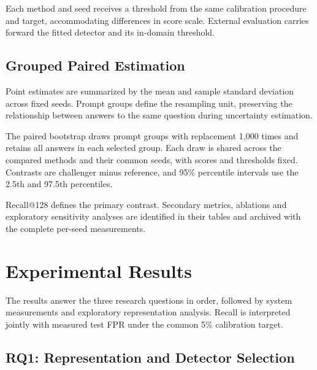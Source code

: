 Each method and seed receives a threshold from the same calibration procedure and target, accommodating differences in score scale. External evaluation carries forward the fitted detector and its in-domain threshold.

\subsection{Grouped Paired Estimation}
Point estimates are summarized by the mean and sample standard deviation across fixed seeds. Prompt groups define the resampling unit, preserving the relationship between answers to the same question during uncertainty estimation.

The paired bootstrap draws prompt groups with replacement 1,000 times and retains all answers in each selected group. Each draw is shared across the compared methods and their common seeds, with scores and thresholds fixed. Contrasts are challenger minus reference, and 95\% percentile intervals use the 2.5th and 97.5th percentiles.

Recall@128 defines the primary contrast. Secondary metrics, ablations and exploratory sensitivity analyses are identified in their tables and archived with the complete per-seed measurements.

\section{Experimental Results}\label{sec:results}
The results answer the three research questions in order, followed by system measurements and exploratory representation analysis. Recall is interpreted jointly with measured test FPR under the common 5\% calibration target.
\subsection{RQ1: Representation and Detector Selection}




